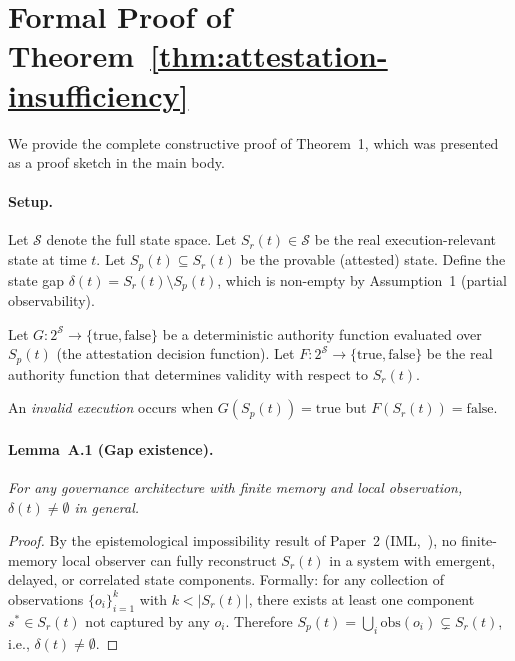 \documentclass[11pt]{article}
\newcommand{\Sr}{S_r}
\newcommand{\Sp}{S_p}
\begin{document}
\appendix
\section{Formal Proof of Theorem~\ref{thm:attestation-insufficiency}}
\label{app:proof}

We provide the complete constructive proof of Theorem~1, which was presented
as a proof sketch in the main body.

\paragraph{Setup.}
Let $\mathcal{S}$ denote the full state space.
Let $\Sr(t) \in \mathcal{S}$ be the real execution-relevant state at time $t$.
Let $\Sp(t) \subseteq \Sr(t)$ be the provable (attested) state.
Define the state gap $\delta(t) = \Sr(t) \setminus \Sp(t)$, which is non-empty
by Assumption~1 (partial observability).

Let $G: 2^{\mathcal{S}} \to \{\text{true}, \text{false}\}$ be a deterministic
authority function evaluated over $\Sp(t)$ (the attestation decision function).
Let $F: 2^{\mathcal{S}} \to \{\text{true}, \text{false}\}$ be the real authority
function that determines validity with respect to $\Sr(t)$.

An \emph{invalid execution} occurs when $G(\Sp(t)) = \text{true}$ but
$F(\Sr(t)) = \text{false}$.

\paragraph{Lemma~A.1 (Gap existence).}
\textit{For any governance architecture with finite memory and local observation,
$\delta(t) \neq \emptyset$ in general.}

\begin{proof}
By the epistemological impossibility result of Paper~2 (IML,~\cite{fernandez2026c}),
no finite-memory local observer can fully reconstruct $\Sr(t)$ in a system with
emergent, delayed, or correlated state components.
Formally: for any collection of observations $\{o_i\}_{i=1}^k$ with $k < |\Sr(t)|$,
there exists at least one component $s^* \in \Sr(t)$ not captured by any $o_i$.
Therefore $\Sp(t) = \bigcup_i \text{obs}(o_i) \subsetneq \Sr(t)$,
i.e., $\delta(t) \neq \emptyset$.
\end{proof}
\end{document}
